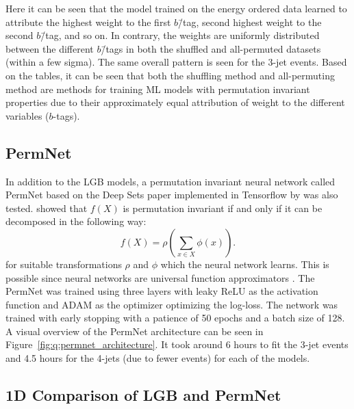 Here it can be seen that the model trained on the energy ordered data learned to attribute the highest weight to the first $b$\=/tag, second highest weight to the second $b$\=/tag, and so on. In contrary, the weights are uniformly distributed between the different $b$\=/tags in both the shuffled and all-permuted datasets (within a few sigma). The same overall pattern is seen for the 3-jet events. Based on the tables, it can be seen that both the shuffling method and all-permuting method are methods for training ML models with permutation invariant properties due to their approximately equal attribution of weight to the different variables ($b$-tags). 



\subsection{PermNet}
\label{subsec:q:permnet}

In addition to the LGB models, a permutation invariant neural network called PermNet based on the Deep Sets paper \autocite{zaheerDeepSets2017} implemented in Tensorflow \citep{tensorflow2015-whitepaper} by \citet{fayeFrederikFayeDeepcalo} was also tested. \citet{zaheerDeepSets2017} showed that $f(X)$ is permutation invariant if and only if it can be decomposed in the following way:
\begin{equation}
  \label{eq:q:deep_sets}
  f(X)=\rho\left(\sum_{x\in X} \phi(x) \right).
\end{equation}
for suitable transformations $\rho$ and $\phi$ which the neural network learns. This is possible since neural networks are universal function approximators \autocite{hornikApproximationCapabilitiesMultilayer1991}. The PermNet was trained using three layers with leaky ReLU \autocite{Maas2013RectifierNI} as the activation function and ADAM \autocite{kingmaAdamMethodStochastic2014} as the optimizer optimizing the log-loss. The network was trained with early stopping with a patience of \num{50} epochs and a batch size of \num{128}. A visual overview of the PermNet architecture can be seen in Figure~\ref{fig:q:permnet_architecture}. It took around \num{6} hours to fit the 3-jet events and \num{4.5} hours for the 4-jets (due to fewer events) for each of the models.

\subsection{1D Comparison of LGB and PermNet}
\label{subsec:q:lgb_permnet_comparison}


